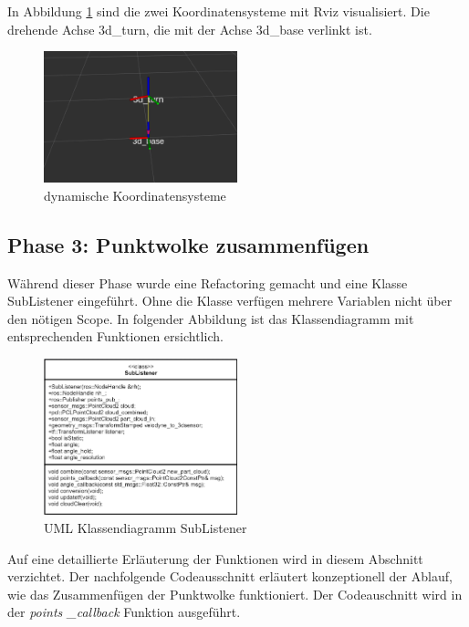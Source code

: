 In Abbildung \ref{fig:koordinaten} sind die zwei Koordinatensysteme mit Rviz visualisiert. Die drehende Achse 3d\_turn, die mit der Achse 3d\_base verlinkt ist.
\begin{figure}[H]
	\centering
	\includegraphics[width=0.5\textwidth]{resources/tf_rotation.PNG}
	\caption[dynamische Koordinatentransformation]{dynamische Koordinatensysteme}
	\label{fig:koordinaten}
\end{figure} 

\subsection{Phase 3: Punktwolke zusammenfügen}
\label{subsec:Phase3}
Während dieser Phase wurde eine \ac{Refactoring} gemacht und eine Klasse SubListener eingeführt. Ohne die Klasse verfügen mehrere Variablen nicht über den nötigen \ac{Scope}. In folgender Abbildung ist das Klassendiagramm mit entsprechenden Funktionen ersichtlich.

\begin{figure}[H]
	\centering
	\includegraphics[width=0.5\textwidth]{resources/classdiagram.PNG}
	\caption[UML Klassendiagramm SuListener]{UML Klassendiagramm SubListener}
	\label{fig:classSubListener}
\end{figure} 

Auf eine detaillierte Erläuterung der Funktionen wird in diesem Abschnitt verzichtet. Der nachfolgende Codeausschnitt erläutert konzeptionell der Ablauf, wie das Zusammenfügen der Punktwolke funktioniert. Der Codeauschnitt wird in der \textit{points \_callback} Funktion ausgeführt.

